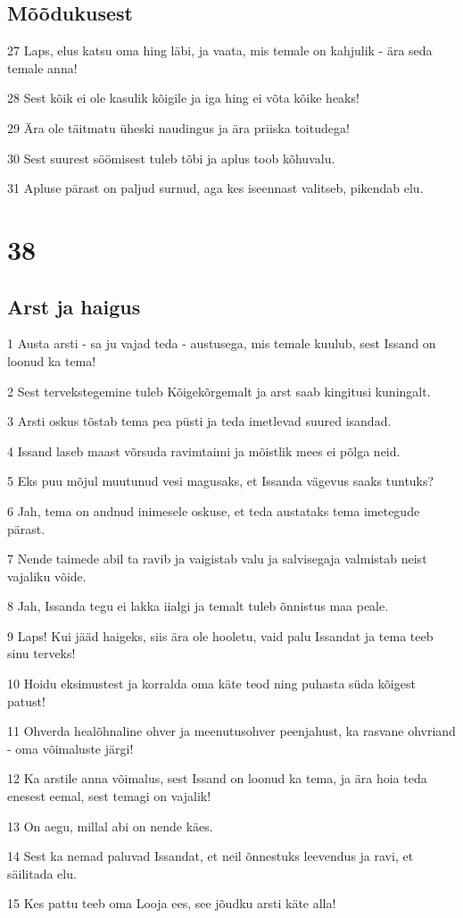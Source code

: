 \section*{Mõõdukusest}

\par 27 Laps, elus katsu oma hing läbi, ja vaata, mis temale on kahjulik - ära seda temale anna!
\par 28 Sest kõik ei ole kasulik kõigile ja iga hing ei võta kõike heaks!
\par 29 Ära ole täitmatu üheski naudingus ja ära priiska toitudega!
\par 30 Sest suurest söömisest tuleb tõbi ja aplus toob kõhuvalu.
\par 31 Apluse pärast on paljud surnud, aga kes iseennast valitseb, pikendab elu.

\chapter{38}

\section*{Arst ja haigus}

\par 1 Austa arsti - sa ju vajad teda - austusega, mis temale kuulub, sest Issand on loonud ka tema!
\par 2 Sest tervekstegemine tuleb Kõigekõrgemalt ja arst saab kingitusi kuningalt.
\par 3 Arsti oskus tõstab tema pea püsti ja teda imetlevad suured isandad.
\par 4 Issand laseb maast võrsuda ravimtaimi ja mõistlik mees ei põlga neid.
\par 5 Eks puu mõjul muutunud vesi magusaks, et Issanda vägevus saaks tuntuks?
\par 6 Jah, tema on andnud inimesele oskuse, et teda austataks tema imetegude pärast.
\par 7 Nende taimede abil ta ravib ja vaigistab valu ja salvisegaja valmistab neist vajaliku võide.
\par 8 Jah, Issanda tegu ei lakka iialgi ja temalt tuleb õnnistus maa peale.
\par 9 Laps! Kui jääd haigeks, siis ära ole hooletu, vaid palu Issandat ja tema teeb sinu terveks!
\par 10 Hoidu eksimustest ja korralda oma käte teod ning puhasta süda kõigest patust!
\par 11 Ohverda healõhnaline ohver ja meenutusohver peenjahust, ka rasvane ohvriand - oma võimaluste järgi!
\par 12 Ka arstile anna võimalus, sest Issand on loonud ka tema, ja ära hoia teda enesest eemal, sest temagi on vajalik!
\par 13 On aegu, millal abi on nende käes.
\par 14 Sest ka nemad paluvad Issandat, et neil õnnestuks leevendus ja ravi, et säilitada elu.
\par 15 Kes pattu teeb oma Looja ees, see jõudku arsti käte alla!

